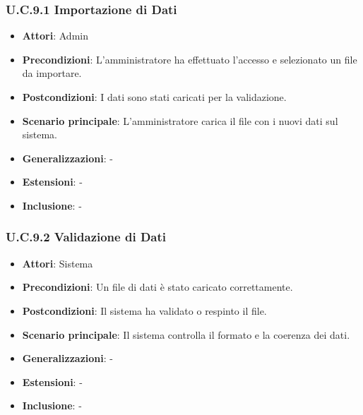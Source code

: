 \subsubsection{U.C.9.1 Importazione di Dati}
\begin{itemize}
    \item \textbf{Attori}: Admin
    \item \textbf{Precondizioni}: L’amministratore ha effettuato l’accesso e selezionato un file da importare.
    \item \textbf{Postcondizioni}: I dati sono stati caricati per la validazione.
    \item \textbf{Scenario principale}: L’amministratore carica il file con i nuovi dati sul sistema.
    \item \textbf{Generalizzazioni}: -
    \item \textbf{Estensioni}: -
    \item \textbf{Inclusione}: -
\end{itemize}
\subsubsection{U.C.9.2 Validazione di Dati}
\begin{itemize}
    \item \textbf{Attori}: Sistema
    \item \textbf{Precondizioni}: Un file di dati è stato caricato correttamente.
    \item \textbf{Postcondizioni}: Il sistema ha validato o respinto il file.
    \item \textbf{Scenario principale}: Il sistema controlla il formato e la coerenza dei dati.
    \item \textbf{Generalizzazioni}: -
    \item \textbf{Estensioni}: -
    \item \textbf{Inclusione}: -
\end{itemize}
